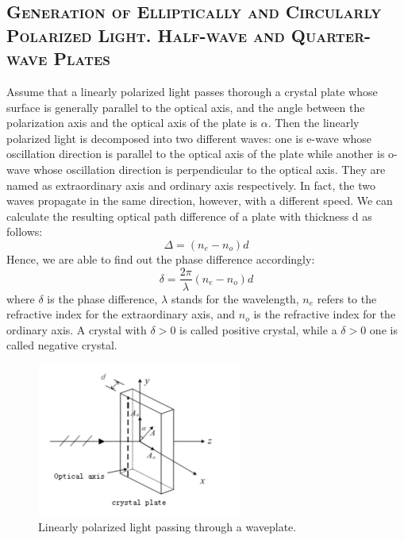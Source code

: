 \documentclass[a4paper,12pt]{article}
\begin{document}
\subsection{\textsc{Generation of Elliptically and Circularly Polarized Light. Half-wave and Quarter-wave Plates}}
Assume that a linearly polarized light passes thorough a crystal plate whose surface is generally parallel to the optical axis, and the angle between the polarization axis and the optical axis of the plate is $\alpha$. Then the linearly polarized light is decomposed into two different waves: one is e-wave whose oscillation direction is parallel to the optical axis of the plate while another is o-wave whose oscillation direction is perpendicular to the optical axis. They are named as extraordinary axis and ordinary axis respectively. In fact, the two waves propagate in the same direction, however, with a different speed. We can calculate the resulting optical path difference of a plate with thickness d as follows:
\begin{equation}
\Delta = (n_e - n_o) d
\end{equation}
Hence, we are able to find out the phase difference accordingly:
\begin{equation}
\displaystyle \delta = \frac{2\pi}{\lambda} (n_e - n_o) d
\end{equation}
where $\delta$ is the phase difference, $\lambda$ stands for the wavelength, $n_e$ refers to the refractive index for the extraordinary axis, and $n_o$ is the refractive index for the ordinary axis. A crystal with $\delta > 0$ is called positive crystal, while a $\delta > 0$ one is called negative crystal.

\begin{figure}[h] 
    \centering
    \includegraphics[width=0.6\textwidth]{Fig4} 
    \caption{Linearly polarized light passing through a waveplate. \cite{labmanual}} 
\end{figure}
\end{document}
